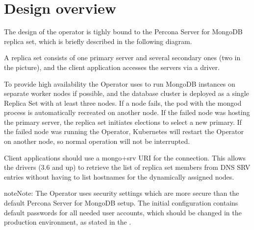 \documentclass[letterpaper,10pt,english]{sphinxmanual}
\let\sphinxpxdimen\pdfpxdimen\else\newdimen\sphinxpxdimen
\begin{document}
\chapter{Design overview}
\label{\detokenize{architecture:design-overview}}\label{\detokenize{architecture::doc}}
The design of the operator is tighly bound to the Percona Server for
MongoDB replica set, which is briefly described in the following
diagram.

\noindent{\hspace*{\fill}\sphinxincludegraphics[width=250\sphinxpxdimen,height=250\sphinxpxdimen]{{replication}.png}\hspace*{\fill}}

A replica set consists of one primary server and several secondary ones
(two in the picture), and the client application accesses the servers
via a driver.

To provide high availability the Operator uses 
to run MongoDB instances on separate worker nodes if possible, and the
database cluster is deployed as a single Replica Set with at least three
nodes. If a node fails, the pod with the mongod process is automatically
re\sphinxhyphen{}created on another node. If the failed node was hosting the primary
server, the replica set initiates elections to select a new primary. If
the failed node was running the Operator, Kubernetes will restart the Operator on
another node, so normal operation will not be interrupted.

Client applications should use a mongo+srv URI for the connection. This
allows the drivers (3.6 and up) to retrieve the list of replica set
members from DNS SRV entries without having to list hostnames for the
dynamically assigned nodes.

\begin{sphinxadmonition}{note}{Note:}
The Operator uses security settings which are more secure
than the default Percona Server for MongoDB setup. The initial
configuration contains default passwords for all needed user accounts,
which should be changed in the production environment, as stated in
the  .
\end{sphinxadmonition}

\noindent{\hspace*{\fill}\sphinxincludegraphics[width=250\sphinxpxdimen,height=250\sphinxpxdimen]{{operator}.png}\hspace*{\fill}}
\end{document}

